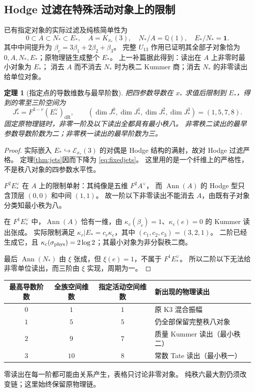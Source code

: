 \documentclass[11pt,a4paper]{ctexart}
\theoremstyle{cnplain}
\newtheorem{theorem}{定理}[section]
\theoremstyle{definition}
\theoremstyle{remark}
\newcommand{\Q}{\mathbb Q}
\newcommand{\dR}{\mathrm{dR}}
\newcommand{\Ann}{\operatorname{Ann}}
\newcommand{\cE}{\mathcal E}
\begin{document}
\subsection{Hodge 过滤在特殊活动对象上的限制}
已有指定对象的实际过滤及纯核简单性为
\begin{equation}\label{eq:active}
 0\subset A\subset N_*\subset E_*,\quad
 A=K_{x_*}(3),\quad N_*/A=\Q(1),\quad E_*/N_*=\mathbf1.
\end{equation}
其中中间提升为 $\beta_c=3\beta_1+2\beta_2+\beta_3$。
完整 $U_{13}$ 作用已证明其全部子对象恰为 $0,A,N_*,E_*$；原物理链生成整个 $E_*$。
上一补篇据此得到：读出在 $A$ 上非零时最小对象为 $E_*$；
消去 $A$ 而不消去 $N_*$ 时为秩二 Kummer 商；消去 $N_*$ 的非零读出给单位对象。

\begin{theorem}[指定点的导数维数与最早阶数]\label{thm:fixed}
把四参数导数在 $x_*$ 求值后限制到 $E_*$，得到的零至三阶空间为
\begin{equation}\label{eq:fixedjets}
 \boxed{J_*^r=F^{3-r}(E_*^\vee)_{\dR},\qquad
 (\dim J_*^0,\dim J_*^1,\dim J_*^2,\dim J_*^3)=(1,5,7,8).}
\end{equation}
固定原物理链时，非零一阶及以下读出全都具有最小秩八。
非零秩二读出的最早参数导数阶数为二；非零秩一读出的最早阶数为三。
\end{theorem}
\begin{proof}
实际嵌入 $E_*\hookrightarrow\cE_{x_*}(3)$ 的对偶是 Hodge 结构的满射，故对 Hodge 过滤严格。
定理\ref{thm:jets}因而下降为 \eqref{eq:fixedjets}。
这里用的是一个纤维上的严格性，不是秩八对象的四参数水平性。

$F^2E_*^\vee$ 在 $A$ 上的限制单射：其纯像是五维 $F^2A^\vee$，
而 $\Ann(A)$ 的 Hodge 型只含顶层 $(0,0)$ 和中间 $(1,1)$。
故一阶以下非零读出不能消去 $A$，由既有子对象分类知最小秩为八。

在 $F^1E_*^\vee$ 中，$\Ann(A)$ 恰有一维，由
$\kappa_c(\beta_c)=1$、$\kappa_c(e)=0$ 的 Kummer 读出张成。
实际限制满足 $\kappa_r|E_*=c_r\kappa_c$，其中 $(c_1,c_2,c_3)=(3,2,1)$。
二阶已经生成它，且 $\kappa_c(\sigma_{\rm phys})=2\log2$；其最小对象为非分裂秩二商。

最后 $\Ann(N_*)$ 由 $\xi$ 张成，但 $\xi(e)=1$，不属于 $F^1E_*^\vee$。
所以二阶以下无法给非零单位读出，而三阶由 $\xi$ 实现，周期为一。
\end{proof}

\begin{center}
\begin{tabular}{c|c|c|l}
\toprule
最高导数阶数&全族空间维数&指定活动空间维数&新出现的物理读出\\
\midrule
$0$&$1$&$1$&原 K3 混合振幅\\
$1$&$5$&$5$&仍全部保留完整秩八对象\\
$2$&$9$&$7$&质量 Kummer 读出（最小秩二）\\
$3$&$10$&$8$&常数 Tate 读出（最小秩一）\\
\bottomrule
\end{tabular}
\end{center}
零读出在每一阶都可能由关系产生，表格只讨论非零对象。
纯秩六最大割仍须改变链；这里始终保留原物理链。
\end{document}

